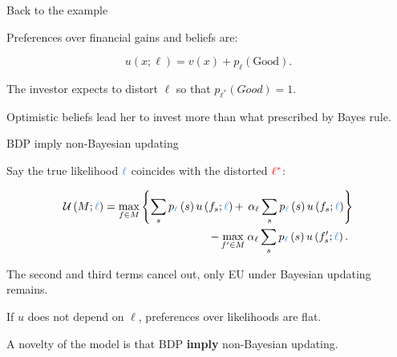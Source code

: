 \documentclass[usenames,dvipsnames,aspectratio=169,11pt,handout]{beamer}
\begin{document}
\begin{frame}{Back to the example}
\begin{table}[H]
\begin{minipage}{0.45\textwidth}
\begin{tikzpicture}[x=0.75pt,y=0.75pt,yscale=-1,xscale=1]
			\end{tikzpicture}
		\end{minipage}
	\end{table}

	\vfill

	Preferences over financial gains and beliefs are:

	\vfill

	\[
		u \left( x; \ell \right) = v \left( x \right) + p_{\ell} \left( \text{Good} \right).
	\] \pause

	\vfill

	The investor expects to distort \( \ell \) so that \( p_{\ell^{*}} \left( Good \right) = 1 \).

	\vfill

	Optimistic beliefs lead her to invest more than what prescribed by Bayes rule.
\end{frame}

\begin{frame}{BDP imply non-Bayesian updating}

	Say the true likelihood \( \textcolor{RoyalBlue}{\ell} \) coincides with the distorted \( \textcolor{red}{\ell^{*}} \):

	\vfill

	\[
		\begin{aligned}
			\mathcal{U} \left(M ; \textcolor{RoyalBlue}{\ell} \right) = \max _{f \in M}\left\{\sum_{s} p_{\textcolor{RoyalBlue}{\ell}} \left( s \right) u \left( f_{s} ; \textcolor{RoyalBlue}{\ell} \right) + \right. & \left. \alpha_{\ell} \sum_{s} p_{\textcolor{RoyalBlue}{\ell}} \left( s \right) u \left( f_{s} ; \textcolor{RoyalBlue}{\ell} \right) \right\} \\
			-\max _{f^{\prime} \in M}                                                                                                                                                                                  & \: \alpha _{\ell} \sum_{s} p_{\textcolor{RoyalBlue}{\ell}} \left( s \right) u\left(f^{\prime}_{s} ; \textcolor{RoyalBlue}{\ell} \right) .
		\end{aligned}
	\]

	\vfill

	The second and third terms cancel out, only EU under Bayesian updating remains. \pause

	\vfill

	If \( u \) does not depend on \( \ell \), preferences over likelihoods are flat.

	\vfill
	A novelty of the model is that BDP \textbf{imply} non-Bayesian updating.

\end{frame}
\end{document}
